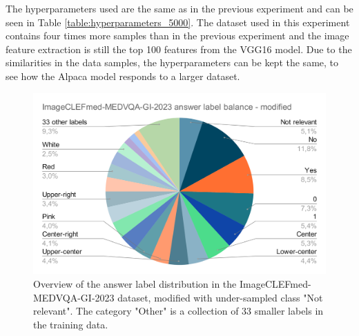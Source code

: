     The hyperparameters used are the same as in the previous experiment and can be seen in Table \ref{table:hyperparameters_5000}. The dataset used in this experiment contains four times more samples than in the previous experiment and the image feature extraction is still the top 100 features from the VGG16 model. Due to the similarities in the data samples, the hyperparameters can be kept the same, to see how the Alpaca model responds to a larger dataset.
    
    \begin{figure}[htb]
        \centerline{
        \includegraphics[width=17cm]{images/ImageCLEFmed-MEDVQA-GI-2023-answer-label-balance-modified.png}}
        \caption{Overview of the answer label distribution in the ImageCLEFmed-MEDVQA-GI-2023 dataset, modified with under-sampled class "Not relevant". The category "Other" is a collection of 33 smaller labels in the training data.}
        \label{fig:ImageCLEFmed-MEDVQA-GI-2023_answer_label_balance-modified}
    \end{figure} 

    

